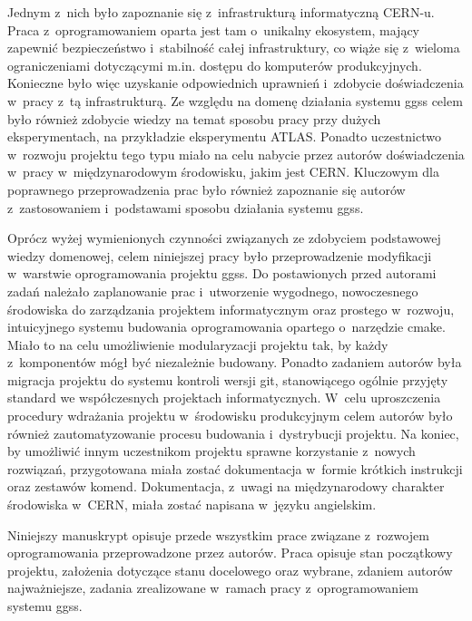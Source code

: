 Jednym z~nich było zapoznanie się z~infrastrukturą informatyczną CERN-u. Praca z~oprogramowaniem oparta jest tam o~unikalny ekosystem, mający zapewnić bezpieczeństwo i~stabilność całej infrastruktury, co wiąże się z~wieloma ograniczeniami dotyczącymi m.in. dostępu do komputerów produkcyjnych. Konieczne było więc uzyskanie odpowiednich uprawnień i~zdobycie doświadczenia w~pracy z~tą infrastrukturą. Ze względu na domenę działania systemu \gls*{ggss} celem było również zdobycie wiedzy na temat sposobu pracy przy dużych eksperymentach, na przykładzie eksperymentu ATLAS. Ponadto uczestnictwo w~rozwoju projektu tego typu miało na celu nabycie przez autorów doświadczenia w~pracy w~międzynarodowym środowisku, jakim jest CERN. Kluczowym dla poprawnego przeprowadzenia prac było również zapoznanie się autorów z~zastosowaniem i~podstawami sposobu działania systemu \gls*{ggss}. \par

Oprócz wyżej wymienionych czynności związanych ze zdobyciem podstawowej wiedzy domenowej, celem niniejszej pracy było przeprowadzenie modyfikacji w~warstwie oprogramowania projektu \gls*{ggss}. Do postawionych przed autorami zadań należało zaplanowanie prac i~utworzenie wygodnego, nowoczesnego środowiska do zarządzania projektem informatycznym oraz prostego w~rozwoju, intuicyjnego systemu budowania oprogramowania opartego o~narzędzie \gls*{cmake}. Miało to na celu umożliwienie modularyzacji projektu tak, by każdy z~komponentów mógł być niezależnie budowany. Ponadto zadaniem autorów była migracja projektu do systemu kontroli wersji \gls*{git}, stanowiącego ogólnie przyjęty standard we współczesnych projektach informatycznych. W~celu uproszczenia procedury wdrażania projektu w~środowisku produkcyjnym celem autorów było również zautomatyzowanie procesu budowania i~dystrybucji projektu. Na koniec, by umożliwić innym uczestnikom projektu sprawne korzystanie z~nowych rozwiązań, przygotowana miała zostać dokumentacja w~formie krótkich instrukcji oraz zestawów komend. Dokumentacja, z~uwagi na międzynarodowy charakter środowiska w~CERN, miała zostać napisana w~języku angielskim. \par

Niniejszy manuskrypt opisuje przede wszystkim prace związane z~rozwojem oprogramowania przeprowadzone przez autorów. Praca opisuje stan początkowy projektu, założenia dotyczące stanu docelowego oraz wybrane, zdaniem autorów najważniejsze, zadania zrealizowane w~ramach pracy z~oprogramowaniem systemu \gls*{ggss}.
